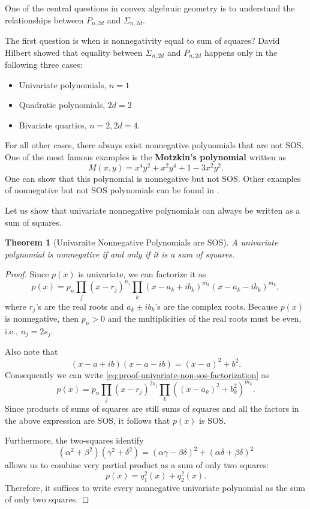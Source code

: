 \documentclass[
]{book}
\newtheorem{theorem}{Theorem}[chapter]
\theoremstyle{definition}
\theoremstyle{definition}
\theoremstyle{definition}
\theoremstyle{definition}
\theoremstyle{remark}
\begin{document}
One of the central questions in convex algebraic geometry is to understand the relationships between \(P_{n,2d}\) and \(\Sigma_{n,2d}\).

The first question is when is nonnegativity equal to sum of squares? David Hilbert showed that equality between \(\Sigma_{n,2d}\) and \(P_{n,2d}\) happens only in the following three cases:

\begin{itemize}
\item
  Univariate polynomials, \(n=1\)
\item
  Quadratic polynomials, \(2d=2\)
\item
  Bivariate quartics, \(n=2, 2d=4\).
\end{itemize}

For all other cases, there always exist nonnegative polynomials that are not SOS. One of the most famous examples is the \textbf{Motzkin's polynomial} written as
\[
M(x,y) = x^4 y^2 + x^2 y^4 + 1 - 3 x^2 y^2.
\]
One can show that this polynomial is nonnegative but not SOS. Other examples of nonnegative but not SOS polynomials can be found in \citep{reznick00cm-some}.

Let us show that univariate nonnegative polynomials can always be written as a sum of squares.

\begin{theorem}[Univaraite Nonnegative Polynomials are SOS]
\protect\hypertarget{thm:UnivaraiteNonSOS}{}\label{thm:UnivaraiteNonSOS}A univariate polynomial is nonnegative if and only if it is a sum of squares.
\end{theorem}

\begin{proof}
Since \(p(x)\) is univariate, we can factorize it as
\begin{equation}
p(x) = p_n \prod_j (x - r_j)^{n_j} \prod_{k} (x - a_k + i b_k)^{m_k} (x - a_k - i b_k)^{m_k},
\label{eq:proof-univariate-non-sos-factorization}
\end{equation}
where \(r_j\)'s are the real roots and \(a_k \pm i b_k\)'s are the complex roots. Because \(p(x)\) is nonnegative, then \(p_n > 0\) and the multiplicities of the real roots must be even, i.e., \(n_j = 2 s_j\).

Also note that
\[
(x - a + ib)(x - a - ib) = (x-a)^2 + b^2.
\]
Consequently we can write \eqref{eq:proof-univariate-non-sos-factorization} as
\[
p(x) = p_n \prod_j (x - r_j)^{2 s_j} \prod_k ((x-a_k)^2 + b_k^2)^{m_k}.
\]
Since products of sums of squares are still sums of squares and all the factors in the above expression are SOS, it follows that \(p(x)\) is SOS.

Furthermore, the two-squares identify
\[
(\alpha^2 + \beta^2)(\gamma^2 + \delta^2) = (\alpha \gamma - \beta \delta)^2 + (\alpha \delta + \beta \delta)^2
\]
allows us to combine very partial product as a sum of only two squares:
\[
p(x) = q_1^2(x) + q_2^2(x).
\]
Therefore, it suffices to write every nonnegative univariate polynomial as the sum of only two squares.
\end{proof}
\end{document}
